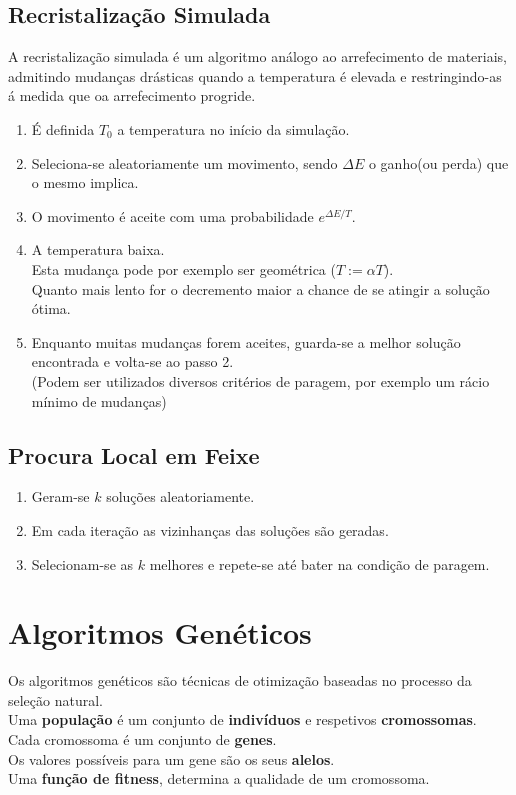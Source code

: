 \documentclass[]{report}
\begin{document}
\subsection{Recristalização Simulada}
A recristalização simulada é um algoritmo análogo ao arrefecimento de materiais,  admitindo mudanças drásticas quando a temperatura é elevada e restringindo-as á medida que oa arrefecimento progride.
\begin{enumerate}
\item É definida $T_0$ a temperatura no início da simulação.
\item Seleciona-se aleatoriamente um movimento, sendo $\Delta E$ o ganho(ou perda) que o mesmo implica.
\item O movimento é aceite com uma probabilidade $e^{\Delta E / T}$.
\item A temperatura baixa.\\
Esta mudança pode por exemplo ser geométrica ($T := \alpha T$).\\
Quanto mais lento for o decremento maior a chance de se atingir a solução ótima.
\item Enquanto muitas mudanças forem aceites, guarda-se a melhor solução encontrada e volta-se ao passo 2.\\
(Podem ser utilizados diversos critérios de paragem, por exemplo um rácio mínimo de mudanças)
\end{enumerate}
\subsection{Procura Local em Feixe}
\begin{enumerate}
	\item Geram-se $k$ soluções aleatoriamente.
	\item Em cada iteração as vizinhanças das soluções são geradas.
	\item Selecionam-se as $k$ melhores e repete-se até bater na condição de paragem.
\end{enumerate}
\section{Algoritmos Genéticos}
Os algoritmos genéticos são técnicas de otimização baseadas no processo da seleção natural.\\
Uma \textbf{população} é um conjunto de \textbf{indivíduos} e respetivos \textbf{cromossomas}.\\
Cada cromossoma é um conjunto de \textbf{genes}.\\
Os valores possíveis para um gene são os seus \textbf{alelos}.\\
Uma \textbf{função de fitness}, determina a qualidade de um cromossoma.
\end{document}
